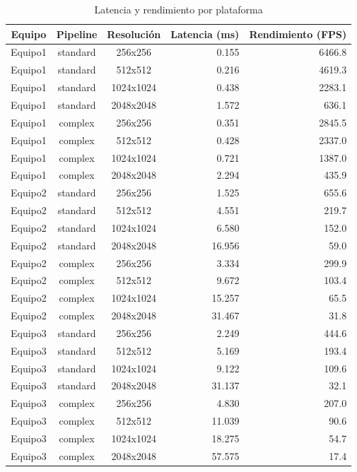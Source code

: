 \begin{table}[htbp]
\centering
\renewcommand{\arraystretch}{1.15}
\setlength{\tabcolsep}{5pt}
\begin{tabular}{|c|c|c|r|r|}
\hline
\rowcolor[gray]{0.90}
\textbf{Equipo} & \textbf{Pipeline} & \textbf{Resolución} & \textbf{Latencia (ms)} & \textbf{Rendimiento (FPS)} \\
\hline
Equipo1 & standard & 256x256 & 0.155 & 6466.8 \\
\hline
Equipo1 & standard & 512x512 & 0.216 & 4619.3 \\
\hline
Equipo1 & standard & 1024x1024 & 0.438 & 2283.1 \\
\hline
Equipo1 & standard & 2048x2048 & 1.572 & 636.1 \\
\hline
Equipo1 & complex & 256x256 & 0.351 & 2845.5 \\
\hline
Equipo1 & complex & 512x512 & 0.428 & 2337.0 \\
\hline
Equipo1 & complex & 1024x1024 & 0.721 & 1387.0 \\
\hline
Equipo1 & complex & 2048x2048 & 2.294 & 435.9 \\
\hline
Equipo2 & standard & 256x256 & 1.525 & 655.6 \\
\hline
Equipo2 & standard & 512x512 & 4.551 & 219.7 \\
\hline
Equipo2 & standard & 1024x1024 & 6.580 & 152.0 \\
\hline
Equipo2 & standard & 2048x2048 & 16.956 & 59.0 \\
\hline
Equipo2 & complex & 256x256 & 3.334 & 299.9 \\
\hline
Equipo2 & complex & 512x512 & 9.672 & 103.4 \\
\hline
Equipo2 & complex & 1024x1024 & 15.257 & 65.5 \\
\hline
Equipo2 & complex & 2048x2048 & 31.467 & 31.8 \\
\hline
Equipo3 & standard & 256x256 & 2.249 & 444.6 \\
\hline
Equipo3 & standard & 512x512 & 5.169 & 193.4 \\
\hline
Equipo3 & standard & 1024x1024 & 9.122 & 109.6 \\
\hline
Equipo3 & standard & 2048x2048 & 31.137 & 32.1 \\
\hline
Equipo3 & complex & 256x256 & 4.830 & 207.0 \\
\hline
Equipo3 & complex & 512x512 & 11.039 & 90.6 \\
\hline
Equipo3 & complex & 1024x1024 & 18.275 & 54.7 \\
\hline
Equipo3 & complex & 2048x2048 & 57.575 & 17.4 \\
\hline
\end{tabular}
\caption{Latencia y rendimiento por plataforma}
\label{tab:interteam_latency_fps_float32}
\end{table}
